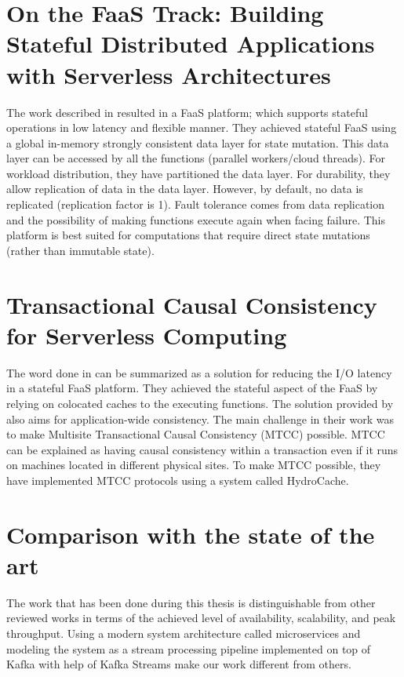 \documentclass[a4]{report}
\begin{document}
    \section{On the FaaS Track: Building Stateful Distributed Applications with Serverless Architectures}
    The work described in \cite{mutableStateless} resulted in a FaaS platform;
    which supports stateful operations in low latency and flexible manner.
    They achieved stateful FaaS using a global in-memory strongly consistent data layer for state mutation.
    This data layer can be accessed by all the functions (parallel workers/cloud threads).
    For workload distribution, they have partitioned the data layer.
    For durability, they allow replication of data in the data layer.
    However, by default, no data is replicated (replication factor is 1).
    Fault tolerance comes from data replication and the possibility of making functions execute again when facing failure.
    This platform is best suited for computations that require direct state mutations (rather than immutable state).


    \section{Transactional Causal Consistency for Serverless Computing}
    The word done in \cite{casualConsistency} can be summarized as a solution for reducing the I/O latency in a stateful FaaS platform.
    They achieved the stateful aspect of the FaaS by relying on colocated caches to the executing functions.
    The solution provided by \cite{casualConsistency} also aims for application-wide consistency.
    The main challenge in their work was to make Multisite Transactional Causal Consistency (MTCC) possible.
    MTCC can be explained as having causal consistency within a transaction even if it runs on machines located in different physical sites.
    To make MTCC possible, they have implemented MTCC protocols using a system called HydroCache.


    \section{Comparison with the state of the art}
    The work that has been done during this thesis is distinguishable from other reviewed works in terms of the
    achieved level of availability, scalability, and peak throughput.
    Using a modern system architecture called microservices and modeling the system as a stream processing pipeline
    implemented on top of Kafka with help of Kafka Streams make our work different from others.
\end{document}
